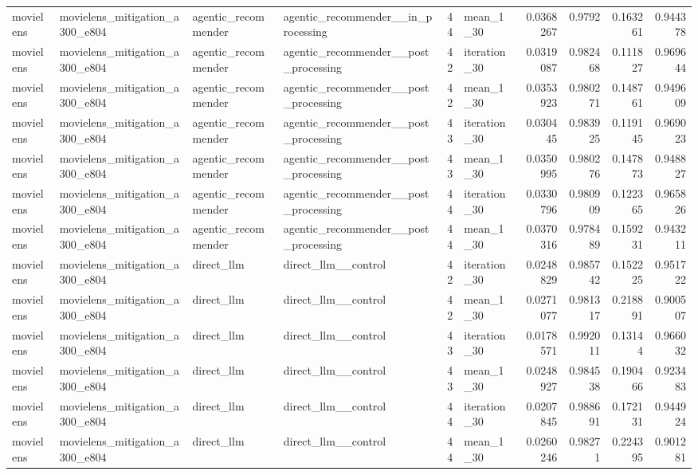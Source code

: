 \begin{table}[htbp!]
\begin{tabular}{llllrlrrrr}
movielens & movielens\_mitigation\_a300\_e804 & agentic\_recommender & agentic\_recommender\_\_in\_processing & 44 & mean\_1\_30 & 0.0368267 & 0.9792 & 0.163261 & 0.944378 \\
movielens & movielens\_mitigation\_a300\_e804 & agentic\_recommender & agentic\_recommender\_\_post\_processing & 42 & iteration\_30 & 0.0319087 & 0.982468 & 0.111827 & 0.969644 \\
movielens & movielens\_mitigation\_a300\_e804 & agentic\_recommender & agentic\_recommender\_\_post\_processing & 42 & mean\_1\_30 & 0.0353923 & 0.980271 & 0.148761 & 0.949609 \\
movielens & movielens\_mitigation\_a300\_e804 & agentic\_recommender & agentic\_recommender\_\_post\_processing & 43 & iteration\_30 & 0.030445 & 0.983925 & 0.119145 & 0.969023 \\
movielens & movielens\_mitigation\_a300\_e804 & agentic\_recommender & agentic\_recommender\_\_post\_processing & 43 & mean\_1\_30 & 0.0350995 & 0.980276 & 0.147873 & 0.948827 \\
movielens & movielens\_mitigation\_a300\_e804 & agentic\_recommender & agentic\_recommender\_\_post\_processing & 44 & iteration\_30 & 0.0330796 & 0.980909 & 0.122365 & 0.965826 \\
movielens & movielens\_mitigation\_a300\_e804 & agentic\_recommender & agentic\_recommender\_\_post\_processing & 44 & mean\_1\_30 & 0.0370316 & 0.978489 & 0.159231 & 0.943211 \\
movielens & movielens\_mitigation\_a300\_e804 & direct\_llm & direct\_llm\_\_control & 42 & iteration\_30 & 0.0248829 & 0.985742 & 0.152225 & 0.951722 \\
movielens & movielens\_mitigation\_a300\_e804 & direct\_llm & direct\_llm\_\_control & 42 & mean\_1\_30 & 0.0271077 & 0.981317 & 0.218891 & 0.900507 \\
movielens & movielens\_mitigation\_a300\_e804 & direct\_llm & direct\_llm\_\_control & 43 & iteration\_30 & 0.0178571 & 0.992011 & 0.13144 & 0.966032 \\
movielens & movielens\_mitigation\_a300\_e804 & direct\_llm & direct\_llm\_\_control & 43 & mean\_1\_30 & 0.0248927 & 0.984538 & 0.190466 & 0.923483 \\
movielens & movielens\_mitigation\_a300\_e804 & direct\_llm & direct\_llm\_\_control & 44 & iteration\_30 & 0.0207845 & 0.988691 & 0.172131 & 0.944924 \\
movielens & movielens\_mitigation\_a300\_e804 & direct\_llm & direct\_llm\_\_control & 44 & mean\_1\_30 & 0.0260246 & 0.98271 & 0.224395 & 0.901281 \\

\end{tabular}
\end{table}
